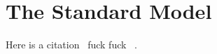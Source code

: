 \chapter[The Standard Model][The Standard Model]{The Standard Model}
\label{chap:standardmodel}

Here is a citation~\cite{1999.ATLAS.Physics-TDR} fuck fuck ~\cite{1999.ATLAS.Physics-TDR-fuck}.


